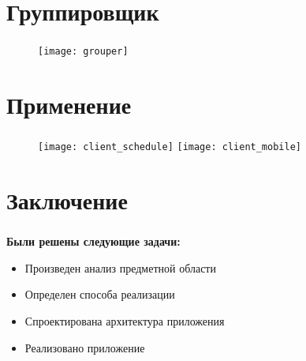 
\section{Группировщик}

\begin{frame}
\frametitle{\insertsection}

\vspace{1cm}

\begin{figure}
    \center
    \texttt{[image: grouper]}
\end{figure}
\end{frame}


\section{Применение}

\begin{frame}
\frametitle{\insertsection}

\begin{figure}[!htb]
        \texttt{[image: client\_schedule]}
    \endminipage\hfill
        \texttt{[image: client\_mobile]}
    \endminipage
\end{figure}

\end{frame}


\section{Заключение}

\begin{frame}
\frametitle{\insertsection}

\textbf{Были решены следующие задачи:}
\begin{itemize}
    \item Произведен анализ предметной области
    \item Определен способа реализации
    \item Спроектирована архитектура приложения
    \item Реализовано приложение
\end{itemize}

\end{frame}

